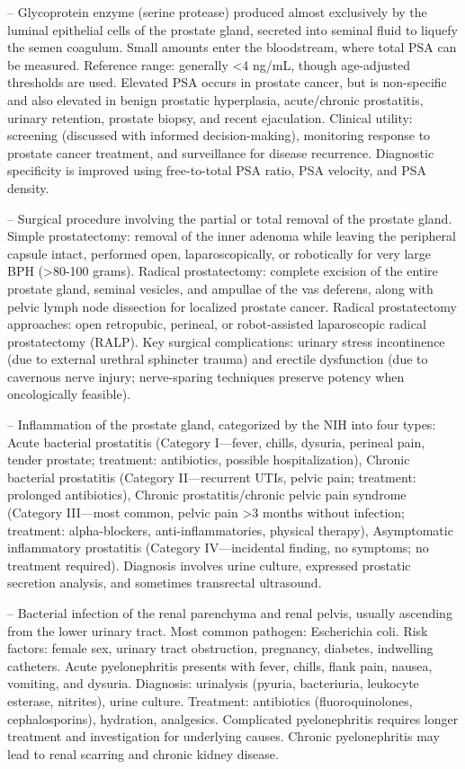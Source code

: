 -- Glycoprotein enzyme (serine protease) produced almost exclusively by the luminal epithelial cells of the prostate gland, secreted into seminal fluid to liquefy the semen coagulum. Small amounts enter the bloodstream, where total PSA can be measured. Reference range: generally <4 ng/mL, though age-adjusted thresholds are used. Elevated PSA occurs in prostate cancer, but is non-specific and also elevated in benign prostatic hyperplasia, acute/chronic prostatitis, urinary retention, prostate biopsy, and recent ejaculation. Clinical utility: screening (discussed with informed decision-making), monitoring response to prostate cancer treatment, and surveillance for disease recurrence. Diagnostic specificity is improved using free-to-total PSA ratio, PSA velocity, and PSA density.


-- Surgical procedure involving the partial or total removal of the prostate gland. Simple prostatectomy: removal of the inner adenoma while leaving the peripheral capsule intact, performed open, laparoscopically, or robotically for very large BPH (>80-100 grams). Radical prostatectomy: complete excision of the entire prostate gland, seminal vesicles, and ampullae of the vas deferens, along with pelvic lymph node dissection for localized prostate cancer. Radical prostatectomy approaches: open retropubic, perineal, or robot-assisted laparoscopic radical prostatectomy (RALP). Key surgical complications: urinary stress incontinence (due to external urethral sphincter trauma) and erectile dysfunction (due to cavernous nerve injury; nerve-sparing techniques preserve potency when oncologically feasible).

-- Inflammation of the prostate gland, categorized by the NIH into four types: Acute bacterial prostatitis (Category I—fever, chills, dysuria, perineal pain, tender prostate; treatment: antibiotics, possible hospitalization), Chronic bacterial prostatitis (Category II—recurrent UTIs, pelvic pain; treatment: prolonged antibiotics), Chronic prostatitis/chronic pelvic pain syndrome (Category III—most common, pelvic pain >3 months without infection; treatment: alpha-blockers, anti-inflammatories, physical therapy), Asymptomatic inflammatory prostatitis (Category IV—incidental finding, no symptoms; no treatment required). Diagnosis involves urine culture, expressed prostatic secretion analysis, and sometimes transrectal ultrasound.

-- Bacterial infection of the renal parenchyma and renal pelvis, usually ascending from the lower urinary tract. Most common pathogen: Escherichia coli. Risk factors: female sex, urinary tract obstruction, pregnancy, diabetes, indwelling catheters. Acute pyelonephritis presents with fever, chills, flank pain, nausea, vomiting, and dysuria. Diagnosis: urinalysis (pyuria, bacteriuria, leukocyte esterase, nitrites), urine culture. Treatment: antibiotics (fluoroquinolones, cephalosporins), hydration, analgesics. Complicated pyelonephritis requires longer treatment and investigation for underlying causes. Chronic pyelonephritis may lead to renal scarring and chronic kidney disease.


